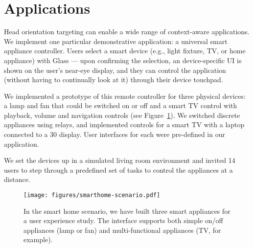 \vfill
\section{Applications}
\label{sec:applications}

Head orientation targeting can enable a wide range of context-aware applications. We implement one particular demonstrative application: a universal smart appliance controller. Users select a smart device (e.g., light fixture, TV, or home appliance) with Glass --- upon confirming the selection, an device-specific UI is shown on the user's near-eye display, and they can control the application (without having to continually look at it) through their device touchpad.

We implemented a prototype of this remote controller for three physical devices: a lamp and fan that could be switched on or off and a smart TV control with playback, volume and navigation controls (see Figure~\ref{fig:smart-home}). We switched discrete appliances using relays, and implemented controls for a smart TV with a laptop connected to a 30\inch{} display. User interfaces for each were pre-defined in our application.

We set the devices up in a simulated living room environment and invited 14 users to step through a predefined set of tasks to control the appliances at a distance. 



\begin{figure}[t]
\centering
\texttt{[image: figures/smarthome-scenario.pdf]}
\caption{In the smart home scenario, we have built three smart appliances for a user experience study. The interface supports both simple on/off appliances (lamp or fan) and multi-functional appliances (TV, for example).}
\label{fig:smart-home}
\end{figure}

